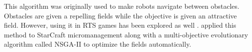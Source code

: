 This algorithm was originally used to make robots navigate between
obstacles. Obstacles are given a repelling fields while the objective
is given an attractive field. However, using it in RTS games has been
explored as well \cite{Hagelback08RTSPotentialFields}.
\citet{Svendsen12SCPotentialFieldsGP} applied this method to
StarCraft micromanagement along with a multi-objective evolutionary
algorithm called NSGA-II to optimize the fields automatically.

